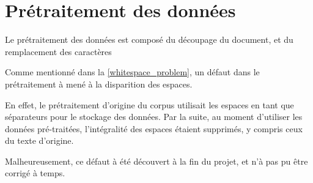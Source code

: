 \section{Prétraitement des données}
Le prétraitement des données est composé du découpage du document, et du remplacement des caractères

Comme mentionné dans la \autoref{whitespace_problem}, un défaut dans le prétraitement à mené à la disparition des espaces.

En effet, le prétraitement d'origine du corpus utilisait les espaces en tant que séparateurs pour le stockage des données. Par la suite, au moment d'utiliser les données pré-traitées, l'intégralité des espaces étaient supprimés, y compris ceux du texte d'origine.

Malheureusement, ce défaut à été découvert à la fin du projet, et n'à pas pu être corrigé à temps.
